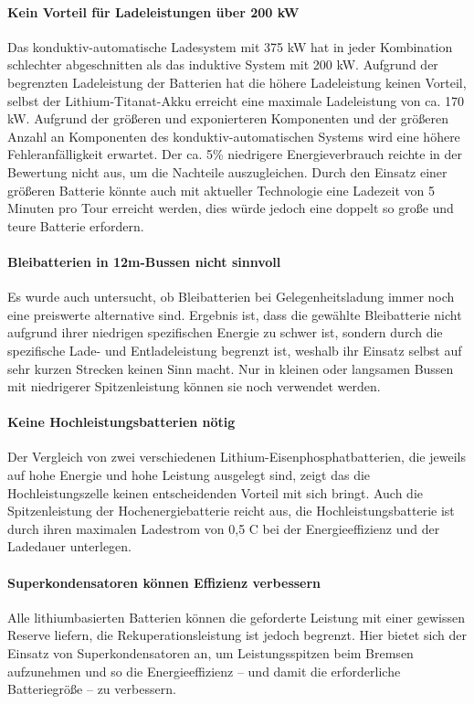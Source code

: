 \paragraph{Kein Vorteil für Ladeleistungen über 200 kW} Das konduktiv-automatische Ladesystem mit 375 kW hat in jeder Kombination schlechter abgeschnitten als das induktive System mit 200 kW. Aufgrund der begrenzten Ladeleistung der Batterien hat die höhere Ladeleistung keinen Vorteil, selbst der Lithium-Titanat-Akku erreicht eine maximale Ladeleistung von ca. 170 kW. Aufgrund der größeren und exponierteren Komponenten und der größeren Anzahl an Komponenten des konduktiv-automatischen Systems wird eine höhere Fehleranfälligkeit erwartet. Der ca. 5\% niedrigere Energieverbrauch reichte in der Bewertung nicht aus, um die Nachteile auszugleichen. Durch den Einsatz einer größeren Batterie könnte auch mit aktueller Technologie eine Ladezeit von 5 Minuten pro Tour erreicht werden, dies würde jedoch eine doppelt so große und teure Batterie erfordern.

\paragraph{Bleibatterien in 12m-Bussen nicht sinnvoll} Es wurde auch untersucht, ob Bleibatterien bei Gelegenheitsladung immer noch eine preiswerte alternative sind. Ergebnis ist, dass die gewählte Bleibatterie nicht aufgrund ihrer niedrigen spezifischen Energie zu schwer ist, sondern durch die spezifische Lade- und Entladeleistung begrenzt ist, weshalb ihr Einsatz selbst auf sehr kurzen Strecken keinen Sinn macht. Nur in kleinen oder langsamen Bussen mit niedrigerer Spitzenleistung können sie noch verwendet werden.

\paragraph{Keine Hochleistungsbatterien nötig} Der Vergleich von zwei verschiedenen Lithium-Eisenphosphatbatterien, die jeweils auf hohe Energie und hohe Leistung ausgelegt sind, zeigt das die Hochleistungszelle keinen entscheidenden Vorteil mit sich bringt. Auch die Spitzenleistung der Hochenergiebatterie reicht aus, die Hochleistungsbatterie ist durch ihren maximalen Ladestrom von 0,5 C bei  der Energieeffizienz und der Ladedauer unterlegen.

\paragraph{Superkondensatoren können Effizienz verbessern} Alle lithiumbasierten Batterien können die geforderte Leistung mit einer gewissen Reserve liefern, die Rekuperationsleistung ist jedoch begrenzt. Hier bietet sich der Einsatz von Superkondensatoren an, um Leistungsspitzen beim Bremsen aufzunehmen und so die Energieeffizienz – und damit die erforderliche Batteriegröße – zu verbessern.

